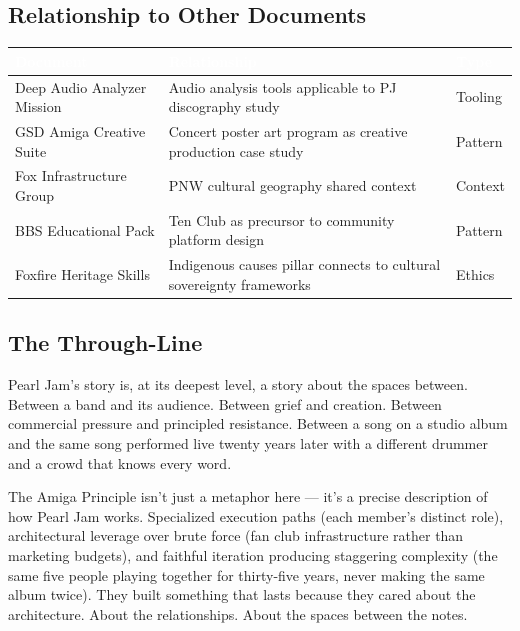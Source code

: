 \documentclass[11pt,letterpaper]{article}
\newcommand{\tableheader}[1]{\textbf{\sffamily\textcolor{white}{#1}}}
\begin{document}
\subsection{Relationship to Other Documents}

\begin{center}
\begin{tabularx}{\textwidth}{L{4cm}XC{2.5cm}}
\toprule
{}
\tableheader{Document} & \tableheader{Relationship} & \tableheader{Type} \\
\midrule
Deep Audio Analyzer Mission & Audio analysis tools applicable to PJ discography study & Tooling \\
GSD Amiga Creative Suite & Concert poster art program as creative production case study & Pattern \\
Fox Infrastructure Group & PNW cultural geography shared context & Context \\
BBS Educational Pack & Ten Club as precursor to community platform design & Pattern \\
Foxfire Heritage Skills & Indigenous causes pillar connects to cultural sovereignty frameworks & Ethics \\
\bottomrule
\end{tabularx}
\end{center}

\subsection{The Through-Line}

Pearl Jam's story is, at its deepest level, a story about the spaces between. Between a band and its audience. Between grief and creation. Between commercial pressure and principled resistance. Between a song on a studio album and the same song performed live twenty years later with a different drummer and a crowd that knows every word.

The Amiga Principle isn't just a metaphor here --- it's a precise description of how Pearl Jam works. Specialized execution paths (each member's distinct role), architectural leverage over brute force (fan club infrastructure rather than marketing budgets), and faithful iteration producing staggering complexity (the same five people playing together for thirty-five years, never making the same album twice). They built something that lasts because they cared about the architecture. About the relationships. About the spaces between the notes.
\end{document}
